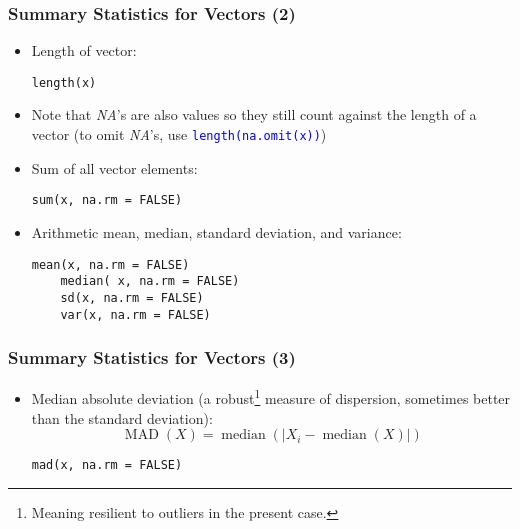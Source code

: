 \documentclass[10pt]{beamer}
\newcommand{\cc}[1]{\texttt{\textcolor{blue}{#1}}}
\DeclareMathOperator{\mad}{MAD}
\DeclareMathOperator{\med}{median}
\theoremstyle{definition}
\begin{document}
\begin{frame}[fragile]
\frametitle{Summary Statistics for Vectors (2)}
\begin{itemize}
	\item Length of vector:
	\begin{lstlisting}[style = rstyle, breaklines]
	length(x)
	\end{lstlisting}

	\item Note that \emph{NA}'s are also values so they still count against the length of a vector (to omit \emph{NA}'s, use \cc{length(na.omit(x))})
	
	\item Sum of all vector elements:
	\begin{lstlisting}[style = rstyle, breaklines]
	sum(x, na.rm = FALSE)
	\end{lstlisting}
	
	\item Arithmetic mean, median, standard deviation, and variance:
	\begin{lstlisting}[style = rstyle, breaklines]
	mean(x, na.rm = FALSE)
	median( x, na.rm = FALSE)
	sd(x, na.rm = FALSE)
	var(x, na.rm = FALSE)
	\end{lstlisting}
\end{itemize}
\end{frame}

\begin{frame}[fragile]
\frametitle{Summary Statistics for Vectors (3)}
\begin{itemize}
	\item Median absolute deviation (a robust\footnote{Meaning resilient to outliers in the present case.} measure of dispersion, sometimes better than the standard deviation):
	\[
		\mad(X) = \med(|X_{i} - \med(X)|)
	\]
	
	\begin{lstlisting}[style = rstyle, breaklines]
	mad(x, na.rm = FALSE)
	\end{lstlisting}
\end{itemize}
\end{frame}
\end{document}
